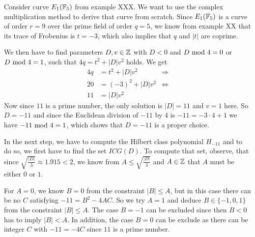 \begin{example} Consider curve $E_1(\mathbb{F}_5)$ from example XXX. We want to use the complex multiplication method to derive that curve from scratch. Since $E_1(\mathbb{F}_5)$ is a curve of order $r=9$ over the prime field of order $q=5$, we know from example XX that its trace of Frobenius is $t=-3$, which also implies that $q$ and $|t|$ are coprime. 

We then have to find parameters $D,v\in\mathbb{Z}$ with $D<0$ and $D \text{ mod } 4=0$ or $D \text{ mod } 4=1$, such that $4q = t^2+ |D|v^2$ holds. We get
\begin{align*}
4q & = t^2+ |D|v^2 & \Rightarrow \\
20 & = (-3)^2 + |D|v^2 & \Leftrightarrow \\
11 & = |D|v^2
\end{align*}
Now since $11$ is a prime number, the only solution is $|D|=11$ and $v=1$ here. So $D=-11$ and since the Euclidean division of $-11$ by $4$ is $-11 = -3\cdot 4 +1$ we have $-11 \text{ mod } 4=1$, which shows that $D=-11$ is a proper choice.

In the next step, we have to compute the Hilbert class polynomial $H_{-11}$ and to do so, we first have to find the set $ICG(D)$. To compute that set, observe, that since $\sqrt{\frac{|D|}{3}}\approx 1.915<2$, we know from $A\leq \sqrt{\frac{|D|}{3}}$ and $A\in\mathbb{Z}$ that $A$ must be either $0$ or $1$. 

For $A=0$, we know $B=0$ from the constraint $|B|\leq A$, but in this case there can be no $C$ satisfying $-11= B^2 -4AC$. So we try $A=1$ and deduce $B\in\{-1,0,1\}$ from the constraint $|B|\leq A$. The case $B=-1$ can be excluded since then $B<0$ has to imply $|B|<A$. In addition, the case $B=0$ can be exclude as there can be integer $C$ with $-11 = -4C$ since $11$ is a prime number. 


\end{example}
